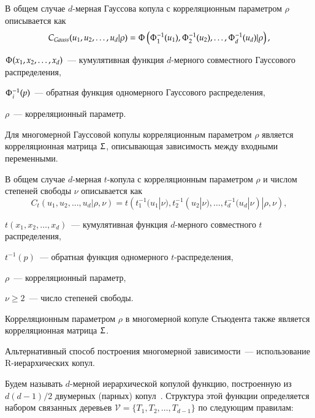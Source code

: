 В общем случае $d$-мерная Гауссова копула с корреляционным параметром $\rho$ описывается как~\cite{Emb2001}
\begin{equation} \label{nCop}
C_{Gauss}(u_1, u_2,\ldots, u_d|\rho) = \Upphi \left( \Upphi_1^{-1} (u_1), \Upphi_2^{-1} (u_2), \ldots, \Upphi_d^{-1} (u_d) | \rho \right),
\end{equation}
\begin{where}
    \item $\Upphi(x_1, x_2, \dots, x_d)$~--- кумулятивная функция $d$-мерного совместного Гауссового распределения,
    \item $\Upphi_i^{-1}(p)$~--- обратная функция одномерного Гауссового распределения,
    \item $\rho$~--- корреляционный параметр.
\end{where}
%
Для многомерной Гауссовой копулы корреляционным параметром $\rho$ является корреляционная матрица $\Upsigma$, описывающая зависимость между входными переменными.

В общем случае $d$-мерная $t$-копула с корреляционным параметром $\rho$ и числом степеней свободы $\nu$ описывается как~\cite{Emb2001}
\begin{equation} \label{tCop}
C_{t}(u_1, u_2,\ldots, u_d|\rho, \nu) = t \left( t_1^{-1} (u_1|\nu), t_2^{-1} (u_2|\nu), \ldots, t_d^{-1} (u_d|\nu) | \rho, \nu \right),
\end{equation}
\begin{where}
    \item $t(x_1, x_2, \dots,x_d)$~--- кумулятивная функция $d$-мерного совместного $t$\-распределения,
    \item $t^{-1}(p)$~--- обратная функция одномерного $t$-распределения,
    \item $\rho$~--- корреляционный параметр,
    \item $\nu \ge 2$~--- число степеней свободы.
\end{where}

Корреляционным параметром $\rho$ в многомерной копуле Стьюдента также является корреляционная матрица $\Upsigma$.

Альтернативный способ построения многомерной зависимости~--- использование R-иерархических копул. 

Будем называть $d$-мерной иерархической копулой функцию, построенную из $d(d - 1)/2$  двумерных (парных) копул~\cite{Bedfort2002}. Структура этой функции определяется набором связанных деревьев $\mathcal{V} =\{T_1, T_2, \ldots, T_ {d-1}\}$ по следующим правилам:

